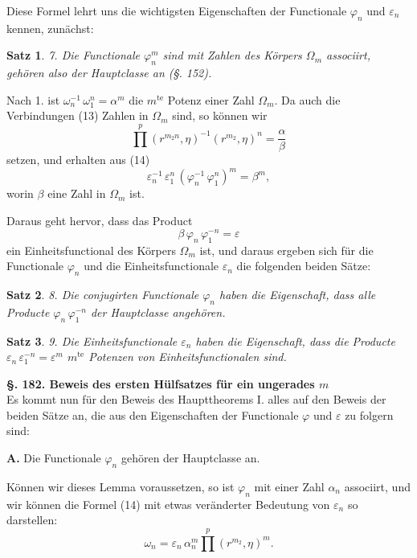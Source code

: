 \documentclass[12pt,a4paper]{article}
\newtheorem*{satz}{Satz}
\begin{document}
Diese Formel lehrt uns die wichtigsten Eigenschaften der Functionale $\varphi_n$ und $\varepsilon_n$ kennen, zunächst:

\begin{satz}
7. Die Functionale $\varphi_n^m$ sind mit Zahlen des Körpers $\Omega_m$ associirt, gehören also der Hauptclasse an (\S. 152).
\end{satz}

Nach 1. ist $\omega_n^{-1}\,\omega_1^n = \alpha^m$ die $m^{\text{te}}$ Potenz einer Zahl $\Omega_m$. Da auch die Verbindungen (13) Zahlen in $\Omega_m$ sind, so können wir
\[
\prod^p (r^{m_2 n}, \eta)^{-1}(r^{m_2}, \eta)^n = \frac{\alpha}{\beta}
\]
setzen, und erhalten aus (14)
\[
\varepsilon_n^{-1}\,\varepsilon_1^n\,(\varphi_n^{-1}\,\varphi_1^n)^m = \beta^m,
\]
worin $\beta$ eine Zahl in $\Omega_m$ ist.

Daraus geht hervor, dass das Product
\[
\beta\,\varphi_n\,\varphi_1^{-n} = \varepsilon
\]
ein Einheitsfunctional des Körpers $\Omega_m$ ist, und daraus ergeben sich für die Functionale $\varphi_n$ und die Einheitsfunctionale $\varepsilon_n$ die folgenden beiden Sätze:

\begin{satz}
8. Die conjugirten Functionale $\varphi_n$ haben die Eigenschaft, dass alle Producte $\varphi_n\,\varphi_1^{-n}$ der Hauptclasse angehören.
\end{satz}

\begin{satz}
9. Die Einheitsfunctionale $\varepsilon_n$ haben die Eigenschaft, dass die Producte $\varepsilon_n\,\varepsilon_1^{-n} = \varepsilon^m$ $m^{\text{te}}$ Potenzen von Einheitsfunctionalen sind.
\end{satz}

\bigskip\noindent\textbf{\S. 182. Beweis des ersten Hülfsatzes für ein ungerades $m$}\\[4pt]

Es kommt nun für den Beweis des Haupttheorems I. alles auf den Beweis der beiden Sätze an, die aus den Eigenschaften der Functionale $\varphi$ und $\varepsilon$ zu folgern sind:

\textbf{A.} Die Functionale $\varphi_n$ gehören der Hauptclasse an.

Können wir dieses Lemma voraussetzen, so ist $\varphi_n$ mit einer Zahl $\alpha_n$ associirt, und wir können die Formel (14) mit etwas veränderter Bedeutung von $\varepsilon_n$ so darstellen:
\begin{equation}\label{eq:182-15}
\omega_n = \varepsilon_n\,\alpha_n^m \prod^p (r^{m_2}, \eta)^m.
\end{equation}
\end{document}
